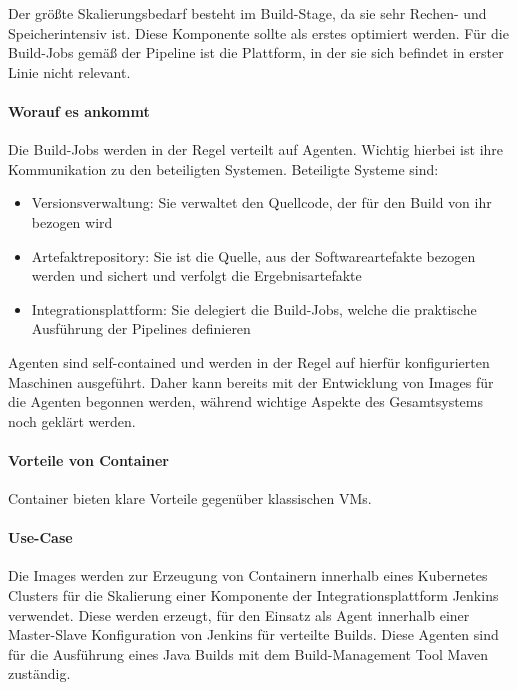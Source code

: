 Der größte Skalierungsbedarf besteht im Build-Stage, da sie sehr Rechen- und Speicherintensiv ist. Diese Komponente sollte als erstes optimiert werden.
Für die Build-Jobs gemäß der Pipeline ist die Plattform, in der sie sich befindet in erster Linie nicht relevant. 

\paragraph{Worauf es ankommt}
Die Build-Jobs werden in der Regel verteilt auf Agenten. Wichtig hierbei ist ihre Kommunikation zu den beteiligten Systemen. Beteiligte Systeme sind:
\begin{itemize}
    \item Versionsverwaltung: Sie verwaltet den Quellcode, der für den Build von ihr bezogen wird
    \item Artefaktrepository: Sie ist die Quelle, aus der Softwareartefakte bezogen werden und sichert und verfolgt die Ergebnisartefakte
    \item Integrationsplattform: Sie delegiert die Build-Jobs, welche die praktische Ausführung der Pipelines definieren
\end{itemize}

Agenten sind self-contained und werden in der Regel auf hierfür konfigurierten Maschinen ausgeführt. Daher kann bereits mit der Entwicklung von Images für die Agenten begonnen werden, während wichtige Aspekte des Gesamtsystems noch geklärt werden.

\paragraph{Vorteile von Container}
Container bieten klare Vorteile gegenüber klassischen VMs. 

\paragraph{Use-Case}
Die Images werden zur Erzeugung von Containern innerhalb eines Kubernetes Clusters für die Skalierung einer Komponente der Integrationsplattform Jenkins verwendet. Diese werden erzeugt, für den Einsatz als Agent innerhalb einer Master-Slave Konfiguration von Jenkins für verteilte Builds. Diese Agenten sind für die Ausführung eines Java Builds mit dem Build-Management Tool Maven zuständig.

